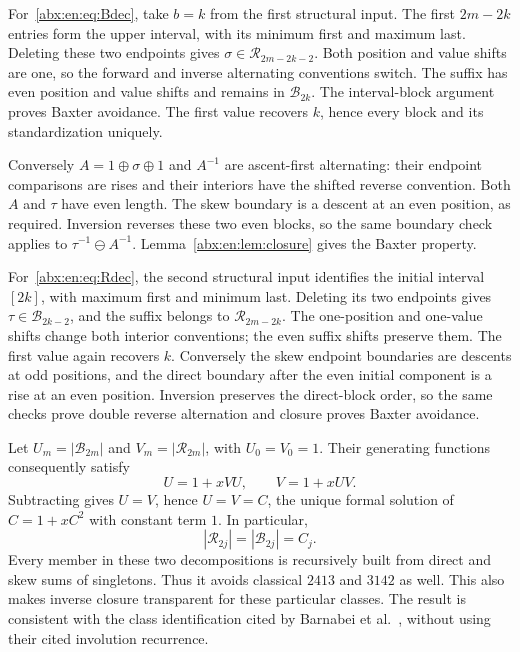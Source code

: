 \documentclass[11pt,letterpaper]{article}
\numberwithin{equation}{section}
\theoremstyle{remark}\newtheorem{remark}[theorem]{Remark}
\newcommand{\BB}{\mathcal B}
\newcommand{\RR}{\mathcal R}
\begin{document}
For~\eqref{abx:en:eq:Bdec}, take $b=k$ from the first structural input.
The first $2m-2k$ entries form the upper interval, with its minimum
first and maximum last. Deleting these two endpoints gives
$\sigma\in\RR_{2m-2k-2}$. Both position and value shifts are one,
so the forward and inverse alternating conventions switch. The suffix
has even position and value shifts and remains in $\BB_{2k}$.
The interval-block argument proves Baxter avoidance. The first value
recovers $k$, hence every block and its standardization uniquely.

Conversely $A=1\oplus\sigma\oplus1$ and $A^{-1}$ are ascent-first
alternating: their endpoint comparisons are rises and their interiors
have the shifted reverse convention. Both $A$ and $\tau$ have even
length. The skew boundary is a descent at an even position, as required.
Inversion reverses these two even blocks, so the same boundary check
applies to $\tau^{-1}\ominus A^{-1}$. Lemma~\ref{abx:en:lem:closure} gives
the Baxter property.

For~\eqref{abx:en:eq:Rdec}, the second structural input identifies the initial
interval $[2k]$, with maximum first and minimum last. Deleting its two
endpoints gives $\tau\in\BB_{2k-2}$, and the suffix belongs to
$\RR_{2m-2k}$. The one-position and one-value shifts change both
interior conventions; the even suffix shifts preserve them. The first
value again recovers $k$. Conversely the skew endpoint boundaries are
descents at odd positions, and the direct boundary after the even
initial component is a rise at an even position. Inversion preserves
the direct-block order, so the same checks prove double reverse
alternation and closure proves Baxter avoidance.

Let $U_m=|\BB_{2m}|$ and $V_m=|\RR_{2m}|$, with $U_0=V_0=1$.
Their generating functions consequently satisfy
\[
 U=1+xVU,\qquad V=1+xUV.
\]
Subtracting gives $U=V$, hence $U=V=C$, the unique formal solution
of $C=1+xC^2$ with constant term $1$. In particular,
\begin{equation}\label{abx:en:eq:catalan-factor}
 |\RR_{2j}|=|\BB_{2j}|=C_j.
\end{equation}
Every member in these two decompositions is recursively built from
direct and skew sums of singletons. Thus it avoids classical $2413$
and $3142$ as well. This also makes inverse closure transparent for
these particular classes. The result is consistent with the class
identification cited by Barnabei et al.~\cite{barnabei}, without
using their cited involution recurrence.
\end{document}
